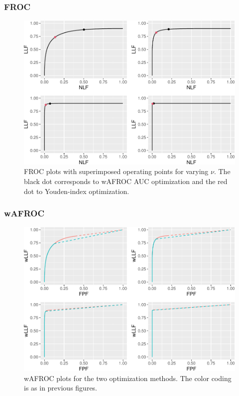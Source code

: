 \documentclass[
]{book}
\begin{document}
\hypertarget{froc-5}{%
\subsubsection{FROC}\label{froc-5}}

\begin{figure}
\centering
\includegraphics{22-optim-op-point_files/figure-latex/optim-op-point-low-performance-vary-mu-vary-all-froc-1.pdf}
\caption{\label{fig:optim-op-point-low-performance-vary-mu-vary-all-froc}FROC plots with superimposed operating points for varying \(\nu\). The black dot corresponds to wAFROC AUC optimization and the red dot to Youden-index optimization.}
\end{figure}

\hypertarget{wafroc-5}{%
\subsubsection{wAFROC}\label{wafroc-5}}

\begin{figure}
\centering
\includegraphics{22-optim-op-point_files/figure-latex/optim-op-point-high-performance-vary-mu-vary-all-wafroc-1.pdf}
\caption{\label{fig:optim-op-point-high-performance-vary-mu-vary-all-wafroc}wAFROC plots for the two optimization methods. The color coding is as in previous figures.}
\end{figure}
\end{document}
